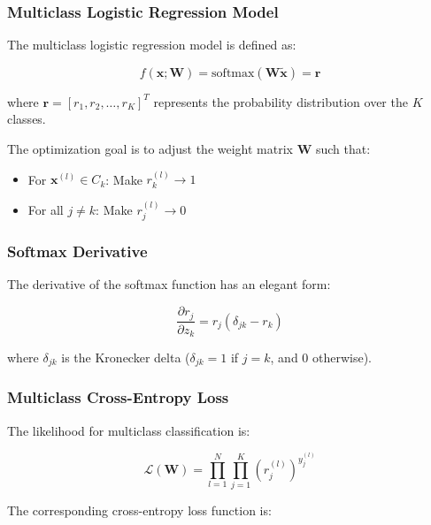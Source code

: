\documentclass[twoside]{article}
\numberwithin{equation}{section}
\begin{document}
	\subsubsection{Multiclass Logistic Regression Model}
	\label{subsubsec:MulticlassLogisticRegressionModel}
	The multiclass logistic regression model is defined as:

	\begin{equation}
	\label{eq:MulticlassModel}
		\boxed{f(\mathbf{x}; \mathbf{W}) = \text{softmax}(\mathbf{W} \tilde{\mathbf{x}}) = \mathbf{r}}
	\end{equation}

	where $\mathbf{r} = [r_1, r_2, \ldots, r_K]^T$ represents the probability distribution over the $K$ classes.

	The optimization goal is to adjust the weight matrix $\mathbf{W}$ such that:
	\begin{itemize}
		\item For $\mathbf{x}^{(l)} \in C_k$: Make $r_k^{(l)} \to 1$
		\item For all $j \neq k$: Make $r_j^{(l)} \to 0$
	\end{itemize}

	\subsubsection{Softmax Derivative}
	\label{subsubsec:SoftmaxDerivative}
	The derivative of the softmax function has an elegant form:

	\begin{equation}
	\label{eq:SoftmaxDerivative}
		\boxed{\frac{\partial r_j}{\partial z_k} = r_j (\delta_{jk} - r_k)}
	\end{equation}

	where $\delta_{jk}$ is the Kronecker delta ($\delta_{jk} = 1$ if $j = k$, and $0$ otherwise).

	\subsubsection{Multiclass Cross-Entropy Loss}
	\label{subsubsec:MulticlassCrossEntropyLoss}
	The likelihood for multiclass classification is:

	\begin{equation}
	\label{eq:MulticlassLikelihood}
		\boxed{\mathcal{L}(\mathbf{W}) = \prod_{l=1}^{N} \prod_{j=1}^{K} (r_j^{(l)})^{y_j^{(l)}}}
	\end{equation}

	The corresponding cross-entropy loss function is:
\end{document}
